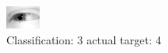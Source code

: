 \begin{figure}[h!]
\begin{center}
\includegraphics[width=0.60\columnwidth]{figures/ID2462_class_3_target_4.png}
\end{center}
\caption{ Classification: 3 actual target: 4}
\label{fig:ID2462_class_3_target_4}
\end{figure}
